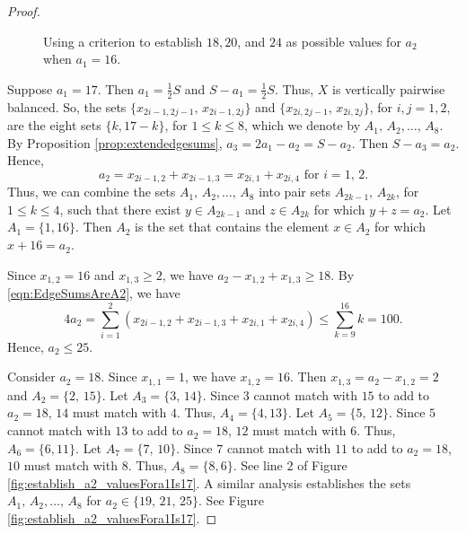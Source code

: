 \documentclass[10pt, reqno]{amsart}
\theoremstyle{definition}
\theoremstyle{plain}
\begin{document}
\begin{proof}
\begin{figure}[hbt!]
    \caption{Using a criterion to establish $18, 20$, and $24$ as possible values for $a_2$ when $a_1=16$.}
    \label{establish_a2_valuesais16}
\end{figure}
  
  Suppose $a_1=17$. 
  Then $a_1=\tfrac{1}{2}S$ and $S-a_1=\tfrac{1}{2}S$.
  Thus, $X$ is vertically pairwise balanced.
  So, the sets
   $\{ x_{2i-1,2j-1},\, x_{2i-1,2j}\}$ and $\{ x_{2i,2j-1},\, x_{2i,2j}\}$,
 for $i,j=1,2$, are the eight sets $\{k,17-k\}$, for $1\le k \le 8$,
 which we denote by $A_1, \, A_2,\ldots,\, A_8$.
 By Proposition \ref{prop:extendedgesums}, $a_3=2a_1-a_2=S-a_2$. Then $S-a_3=a_2$.
 Hence,
   \begin{equation}\label{eqn:EdgeSumsAreA2}
      a_2=x_{2i-1,2}+x_{2i-1,3}=x_{2i,1}+x_{2i,4}
      \text{ \ for \ }i=1,\, 2.
  \end{equation}
 Thus, we can combine the sets $A_1, \, A_2,\ldots,\, A_8$ into pair sets
 $A_{2k-1},\, A_{2k}$, for $1\le k \le 4$, such that
there exist $y\in A_{2k-1}$ and $z\in A_{2k}$
  for which $y+z=a_2$.
  Let $A_1=\{ 1,16\}$.
  Then $A_2$ is the set that contains the element 
  $x\in A_2$ for which $x+16=a_2$.

Since $x_{1,2}=16$ and $x_{1,3}\ge 2$, we have
$a_2-x_{1,2}+x_{1,3}\ge 18$.
  By \eqref{eqn:EdgeSumsAreA2}, we have
  \begin{equation*}
      4a_2= \sum_{i=1}^2 (x_{2i-1,2}+x_{2i-1,3} +x_{2i,1}+x_{2i,4})
 \le \sum_{k=9}^{16} k =100.
  \end{equation*}
 Hence, $a_2\le 25$.

 Consider $a_2=18$. 
 Since $x_{1,1}=1$, we have $x_{1,2}=16$.
 Then $x_{1,3}=a_2-x_{1,2}=2$ and $A_2=\{2,\, 15\}$.
 Let $A_3=\{3,\, 14\}$. Since $3$ cannot match with $15$ to add to $a_2=18$,
 $14$ must match with $4$. Thus, $A_4=\{4, 13\}$.
 Let $A_5=\{5,\, 12\}$. Since $5$ cannot match with $13$ to add to $a_2=18$,
 $12$ must match with $6$. Thus, $A_6=\{6, 11\}$.
 Let $A_7=\{7,\, 10\}$. Since $7$ cannot match with $11$ to add to $a_2=18$,
 $10$ must match with $8$. Thus, $A_8=\{8, 6\}$.
 See line 2 of Figure \ref{fig:establish_a2_valuesFora1Is17}.
 A similar analysis establishes the sets $A_1,\, A_2,\ldots,\, A_8$
 for $a_2\in\{19,\, 21, \, 25\}$. See Figure \ref{fig:establish_a2_valuesFora1Is17}.
 

\end{proof}
\end{document}

